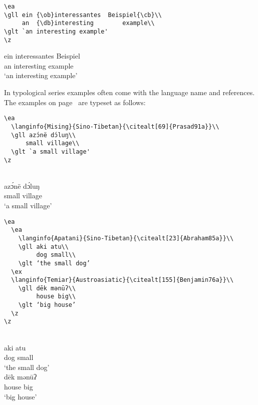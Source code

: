\begin{verbatim}
\ea
\gll ein {\ob}interessantes  Beispiel{\cb}\\
     an  {\db}interesting        example\\
\glt `an interesting example'
\z 
\end{verbatim}

\ea
\def\exfont{\normalsize\itshape}
\gll ein {\ob}interessantes       Beispiel{\cb}\\
     an  {\db}interesting example\\
\glt `an interesting example'
\z 
 


In typological series examples often come with the language name and references. The examples on
page~\pageref{ex-typology} are typeset as follows:
\begin{verbatim}
\ea
  \langinfo{Mising}{Sino-Tibetan}{\citealt[69]{Prasad91a}}\\
  \gll azɔ́në dɔ́luŋ\\
      small village\\ 
  \glt `a small village' 
\z
\end{verbatim}
\ea
  \\
  \gll azɔ́në dɔ́luŋ\\
      small village\\ 
  \glt `a small village' 
\z

\newpage

\begin{verbatim}
\ea 
  \ea
    \langinfo{Apatani}{Sino-Tibetan}{\citealt[23]{Abraham85a}}\\
    \gll aki atu\\ 
         dog small\\ 
    \glt ‘the small dog’ 
  \ex
  \langinfo{Temiar}{Austroasiatic}{\citealt[155]{Benjamin76a}}\\ 
    \gll dēk mənūʔ\\
         house big\\
    \glt ‘big house’ 
  \z
\z
\end{verbatim}

\ea 
  \ea
    \\
    \gll aki atu\\ 
	dog small\\ 
    \glt ‘the small dog’ 
  \ex
  \\ 
    \gll dēk mənūʔ\\
	house big\\
    \glt ‘big house’ 
  \z
\z


